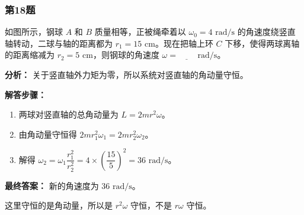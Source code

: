 \documentclass[12pt,a4paper]{ctexart}
\begin{document}
\subsubsection*{第18题}
\begin{tcolorbox}[colback=gray!2!white,colframe=black!60,title={题目}]
如图所示，钢球 \(A\) 和 \(B\) 质量相等，正被绳牵着以 \(\omega_0=4\text{ rad/s}\) 的角速度绕竖直轴转动，二球与轴的距离都为 \(r_1=15\text{ cm}\)。现在把轴上环 \(C\) 下移，使得两球离轴的距离缩减为 \(r_2=5\text{ cm}\)，则钢球的角速度 \(\omega=\underline{\qquad}\text{ rad/s}\)。\par
\end{tcolorbox}
\begin{tcolorbox}[colback=blue!2!white,colframe=blue!55!black,title={完整答案}]
\textbf{分析：}
关于竖直轴外力矩为零，所以系统对竖直轴的角动量守恒。\par
\textbf{解答步骤：}
\begin{enumerate}
\item 两球对竖直轴的总角动量为 \(L=2mr^2\omega\)。
\item 由角动量守恒得 \(2mr_1^2\omega_1=2mr_2^2\omega_2\)。
\item 解得 \(\omega_2=\omega_1\dfrac{r_1^2}{r_2^2}=4\times \left(\dfrac{15}{5}\right)^2=36\text{ rad/s}\)。
\end{enumerate}
\textbf{最终答案：}
新的角速度为 \(36\text{ rad/s}\)。\par
\end{tcolorbox}
\begin{tcolorbox}[colback=red!2!white,colframe=red!55!black,title={易错点}]
这里守恒的是角动量，所以是 \(r^2\omega\) 守恒，不是 \(r\omega\) 守恒。\par
\end{tcolorbox}
\end{document}
